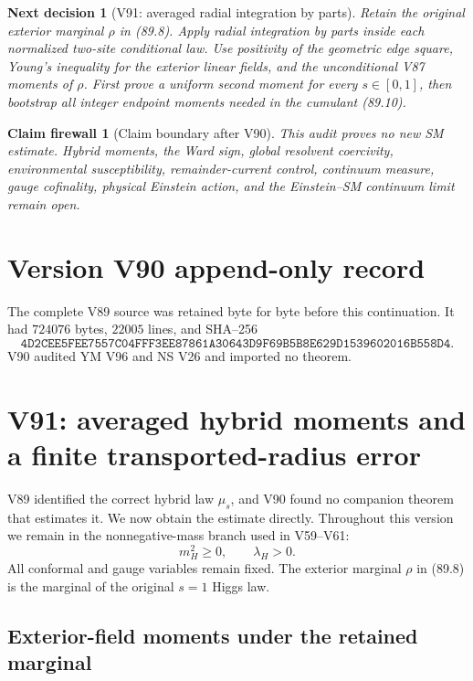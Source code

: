\documentclass[11pt]{article}
\newtheorem{firewall}[theorem]{Claim firewall}
\newtheorem{decision}[theorem]{Next decision}
\theoremstyle{remark}
\begin{document}
\begin{decision}[V91: averaged radial integration by parts]
\label{dec:v17v90-next}
Retain the original exterior marginal \(\rho\) in (89.8).  Apply radial
integration by parts inside each normalized two-site conditional law.
Use positivity of the geometric edge square, Young's inequality for
the exterior linear fields, and the unconditional V87 moments of
\(\rho\).  First prove a uniform second moment for every
\(s\in[0,1]\), then bootstrap all integer endpoint moments needed in
the cumulant (89.10).
\end{decision}

\begin{firewall}[Claim boundary after V90]
\label{fire:v17v90}
This audit proves no new SM estimate.  Hybrid moments, the Ward sign,
global resolvent coercivity, environmental susceptibility,
remainder-current control, continuum measure, gauge cofinality,
physical Einstein action, and the Einstein--SM continuum limit remain
open.
\end{firewall}

\section*{Version V90 append-only record}
The complete V89 source was retained byte for byte before this
continuation.  It had \(724076\) bytes, \(22005\) lines, and SHA--256
\[
 \texttt{4D2CEE5FEE7557C04FFF3EE87861A30643D9F69B5B8E629D1539602016B558D4}.
\]
V90 audited YM V96 and NS V26 and imported no theorem.


\section{V91: averaged hybrid moments and a finite transported-radius error}
\label{sec:v17v91}

V89 identified the correct hybrid law \(\mu_s\), and V90 found no
companion theorem that estimates it.  We now obtain the estimate
directly.  Throughout this version we remain in the nonnegative-mass
branch used in V59--V61:
\[
 m_H^2\geq0,
 \qquad \lambda_H>0.                                \tag{91.1}
\]
All conformal and gauge variables remain fixed.  The exterior marginal
\(\rho\) in (89.8) is the marginal of the original \(s=1\) Higgs law.

\subsection{Exterior-field moments under the retained marginal}
\end{document}
